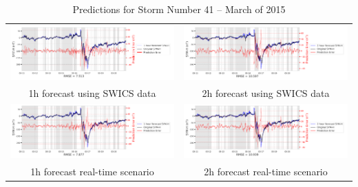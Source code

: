 \documentclass[draft,sw]{agutexSI2019}
\begin{document}
\begin{table}
\centering
\begin{tabular}{cc}
\includegraphics[width=0.49\linewidth]{paper_plots_shade/1h_swics/1h_swics_storm_41.png}
&
\includegraphics[width=0.49\linewidth]{paper_plots_shade/2h_swics/2h_swics_storm_41.png}
\\
1h forecast using SWICS data & 2h forecast using SWICS data
\vspace*{12pt}
\\
\includegraphics[width=0.49\linewidth]{paper_plots_shade/1h_rt/1h_rt_storm_41.png}
&
\includegraphics[width=0.49\linewidth]{paper_plots_shade/2h_rt/2h_rt_storm_41.png}
\\
1h forecast real-time scenario & 2h forecast real-time scenario 
\vspace*{12pt}
\\
\end{tabular}
\caption{Predictions for Storm Number 41 -- March of 2015}
\label{storm-41}
\end{table}
\end{document}
